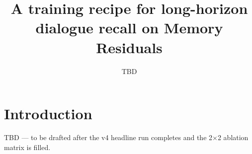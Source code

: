 \documentclass{article}
\title{A training recipe for long-horizon dialogue recall on Memory Residuals}
\author{TBD}
\begin{document}
\maketitle

\section{Introduction}
TBD --- to be drafted after the v4 headline run completes and the
2$\times$2 ablation matrix is filled.
\end{document}
